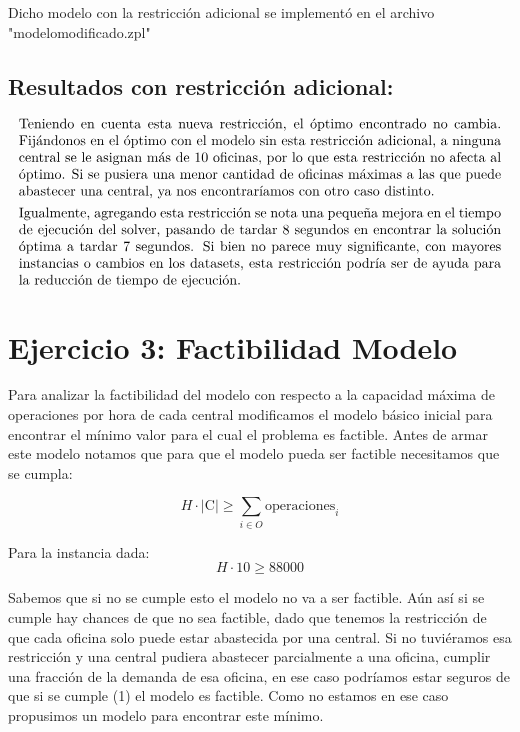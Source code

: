 \documentclass{article}
\begin{document}
Dicho modelo con la restricción adicional se implementó en el archivo "modelomodificado.zpl"

\subsection*{Resultados con restricción adicional:}
\[
\parbox{\textwidth}{Teniendo en cuenta esta nueva restricción, el óptimo encontrado no cambia. Fijándonos en el óptimo con el modelo sin esta restricción adicional, a ninguna central se le asignan más de 10 oficinas, por lo que esta restricción no afecta al óptimo. Si se pusiera una menor cantidad de oficinas máximas a las que puede abastecer una central, ya nos encontraríamos con otro caso distinto.}
\]
\[
\parbox{\textwidth}{Igualmente, agregando esta restricción se nota una pequeña mejora en el tiempo de ejecución del solver, pasando de tardar 8 segundos en encontrar la solución óptima a tardar 7 segundos. Si bien no parece muy significante, con mayores instancias o cambios en los datasets, esta restricción podría ser de ayuda para la reducción de tiempo de ejecución.}
\]

\section*{Ejercicio 3: Factibilidad Modelo}

Para analizar la factibilidad del modelo con respecto a la capacidad máxima de operaciones por hora de cada central modificamos el modelo básico inicial para encontrar el mínimo valor para el cual el problema es factible. 
Antes de armar este modelo notamos que para que el modelo pueda ser factible necesitamos que se cumpla:

\[
H \cdot \lvert \text{C} \rvert \geq \sum_{i \in O} \text{operaciones}_i \tag{1} 
\]

Para la instancia dada: 
\[
H \cdot 10 \geq 88000
\]

Sabemos que si no se cumple esto el modelo no va a ser factible. Aún así si se cumple hay chances de que no sea factible, dado que tenemos la restricción de que cada oficina solo puede estar abastecida por una central. Si no tuviéramos esa restricción y una central pudiera abastecer parcialmente a una oficina, cumplir una fracción de la demanda de esa oficina, en ese caso podríamos estar seguros de que si se cumple (1) el modelo es factible. Como no estamos en ese caso propusimos un modelo para encontrar este mínimo.
\end{document}
